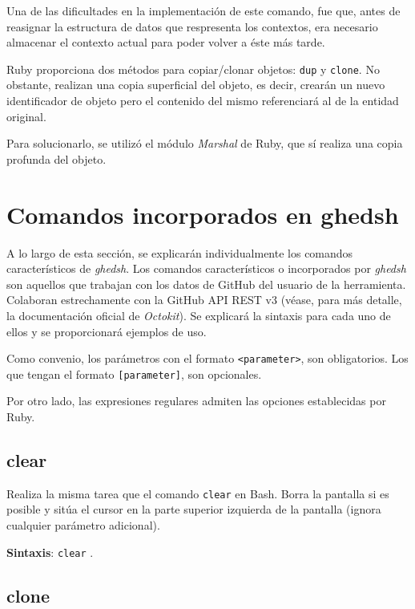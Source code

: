 Una de las dificultades en la implementación de este comando, fue que, antes de reasignar la estructura de datos que respresenta los contextos, era necesario almacenar el contexto actual para poder volver a éste más tarde.
\bigskip

Ruby proporciona dos métodos para copiar/clonar objetos: \verb|dup|\cite{B21} y \verb|clone|\cite{B22}. No obstante, realizan una copia superficial del objeto, es decir, crearán un nuevo identificador de objeto pero
el contenido del mismo referenciará al de la entidad original.
\bigskip

Para solucionarlo, se utilizó el módulo {\it Marshal}\cite{B23} de Ruby, que sí realiza una copia profunda del objeto.



\section{Comandos incorporados en ghedsh}
\label{3:sec:3}

A lo largo de esta sección, se explicarán individualmente los comandos característicos de {\it ghedsh}. Los comandos característicos o incorporados por {\it ghedsh}
son aquellos que trabajan con los datos de GitHub del usuario de la herramienta. Colaboran estrechamente con la GitHub API REST v3 (véase, para más detalle, la documentación oficial de {\it Octokit}\cite{B24}).
Se explicará la sintaxis para cada uno de ellos y se proporcionará ejemplos de uso.
\bigskip

Como convenio, los parámetros con el formato \verb|<parameter>|, son obligatorios. Los que tengan el formato \verb|[parameter]|, son opcionales.
\bigskip

Por otro lado, las expresiones regulares admiten las opciones establecidas por Ruby.

\subsection{clear}
\label{3.3.1}

Realiza la misma tarea que el comando \verb|clear| en Bash. Borra la pantalla si es posible y sitúa el cursor en la parte superior izquierda de la pantalla (ignora cualquier parámetro adicional).

\textbf{Sintaxis}: \verb|clear| .

\subsection{clone}
\label{3.3.2}

